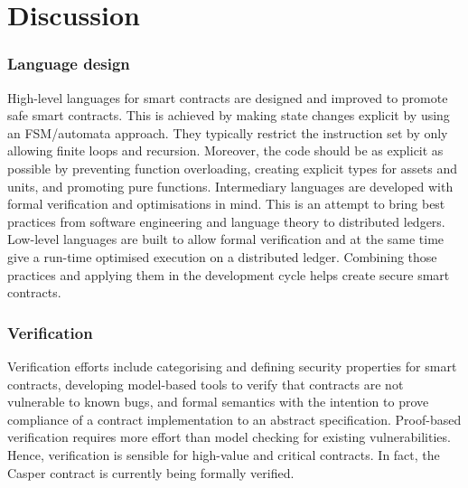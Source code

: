 \section{Discussion}
\label{discuss}

\subsubsection{Language design}
High-level languages for smart contracts are designed and improved to promote safe smart contracts.
This is achieved by making state changes explicit by using an FSM/automata approach. 
They typically restrict the instruction set by only allowing finite loops and recursion.
Moreover, the code should be as explicit as possible by preventing function overloading, creating explicit types for assets and units, and promoting pure functions.
Intermediary languages are developed with formal verification and optimisations in mind.
This is an attempt to bring best practices from software engineering and language theory to distributed ledgers.
Low-level languages are built to allow formal verification and at the same time give a run-time optimised execution on a distributed ledger.
Combining those practices and applying them in the development cycle helps create secure smart contracts.

\subsubsection{Verification}
Verification efforts include categorising and defining security properties for smart contracts, developing model-based tools to verify that contracts are not vulnerable to known bugs, and formal semantics with the intention to prove compliance of a contract implementation to an abstract specification. Proof-based verification requires more effort than model checking for existing vulnerabilities. Hence, verification is sensible for high-value and critical contracts. In fact, the Casper contract is currently being formally verified.

